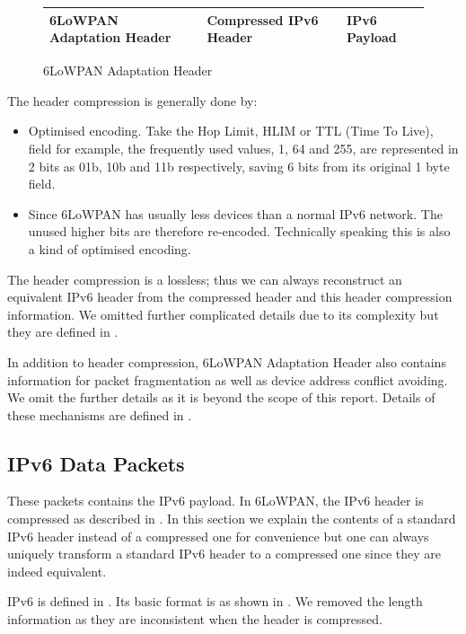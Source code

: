 \begin{figure}[h!]
	\centering
	\begin{tabular}{|l|l|l|}
		\hline
		6LoWPAN Adaptation Header & Compressed IPv6 Header & IPv6 Payload \\ \hline
	\end{tabular}
	\caption{6LoWPAN Adaptation Header}
\label{Fig: 6LoWPAN Adaptation Header}
\end{figure}

The header compression is generally done by:
\begin{itemize}
	\item Optimised encoding. Take the Hop Limit, HLIM or TTL (Time To Live), field for example, the frequently used values, 1, 64 and 255, are represented in 2 bits as 01b, 10b and 11b respectively, saving 6 bits from its original 1 byte field.
	\item Since 6LoWPAN has usually less devices than a normal IPv6 network. The unused higher bits are therefore re-encoded. Technically speaking this is also a kind of optimised encoding.
\end{itemize}
The header compression is a lossless; thus we can always reconstruct an equivalent IPv6 header from the compressed header and this header compression information. We omitted further complicated details due to its complexity but they are defined in \cite{rfc6282}.

In addition to header compression, 6LoWPAN Adaptation Header also contains information for packet fragmentation as well as device address conflict avoiding. We omit the further details as it is beyond the scope of this report. Details of these mechanisms are defined in \cite{rfc4944}.

\subsection{IPv6 Data Packets} \label{Subsec: IPv6 Data Packets}
These packets contains the IPv6 payload. In 6LoWPAN, the IPv6 header is compressed as described in . In this section we explain the contents of a standard IPv6 header instead of a compressed one for convenience but one can always uniquely transform a standard IPv6 header to a compressed one since they are indeed equivalent.

IPv6 is defined in \cite{rfc2460}. Its basic format is as shown in . We removed the length information as they are inconsistent when the header is compressed.

